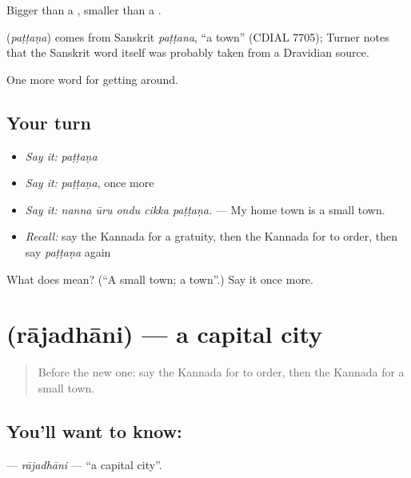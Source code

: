 Bigger than a , smaller than a .

\begin{cousinweb}
\textbf{} (\emph{paṭṭaṇa}) comes from Sanskrit \emph{paṭṭana}, \textquotedblleft{}a town\textquotedblright{} (CDIAL 7705); Turner notes that the Sanskrit word itself was probably taken from a Dravidian source.
\end{cousinweb}

\begin{grammarlens}[title={What you've built}]
One more word for getting around.
\end{grammarlens}

\subsection*{Your turn}
\begin{itemize}
\raggedright
  \item \emph{Say it:} \emph{paṭṭaṇa}
  \item \emph{Say it:} \emph{paṭṭaṇa}, once more
  \item \emph{Say it:} \emph{nanna ūru ondu cikka paṭṭaṇa.} — My home town is a small town.
  \item \emph{Recall:} say the Kannada for a gratuity, then the Kannada for to order, then say \emph{paṭṭaṇa} again
\end{itemize}

\begin{tcolorbox}[breakable,colback=teal!4,colframe=teal!35!black,title={Before you move on}]
What does  mean? (\textquotedblleft{}A small town; a town\textquotedblright{}.) Say it once more.
\end{tcolorbox}
\section[\texorpdfstring{\kn{ರಾಜಧಾನಿ} (rājadhāni)}{ರಾಜಧಾನಿ (rājadhāni)}]{ (rājadhāni) — a capital city}

\label{lesson:KA-C465-rajadhani}



\begin{quote}
Before the new one: say the Kannada for to order, then the Kannada for a small town.
\end{quote}

\subsection*{You'll want to know: }
\textbf{} — \emph{rājadhāni} — \textquotedblleft{}a capital city\textquotedblright{}.

